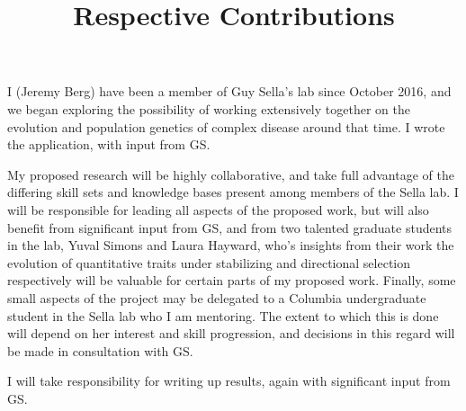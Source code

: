 \documentclass[11pt]{article}
\title{Respective Contributions}
\date{}
\begin{document}
\maketitle

I (Jeremy Berg) have been a member of Guy Sella's lab since October 2016, and we began exploring the possibility of working extensively together on the evolution and population genetics of complex disease around that time. I wrote the application, with input from GS.

My proposed research will be highly collaborative, and take full advantage of the differing skill sets and knowledge bases present among members of the Sella lab. I will be responsible for leading all aspects of the proposed work, but will also benefit from significant input from GS, and from two talented graduate students in the lab, Yuval Simons and Laura Hayward, who's insights from their work the evolution of quantitative traits under stabilizing and directional selection respectively will be valuable for certain parts of my proposed work. Finally, some small aspects of the project may be delegated to a Columbia undergraduate student in the Sella lab who I am mentoring. The extent to which this is done will depend on her interest and skill progression, and decisions in this regard will be made in consultation with GS.

I will take responsibility for writing up results, again with significant input from GS.
\end{document}
